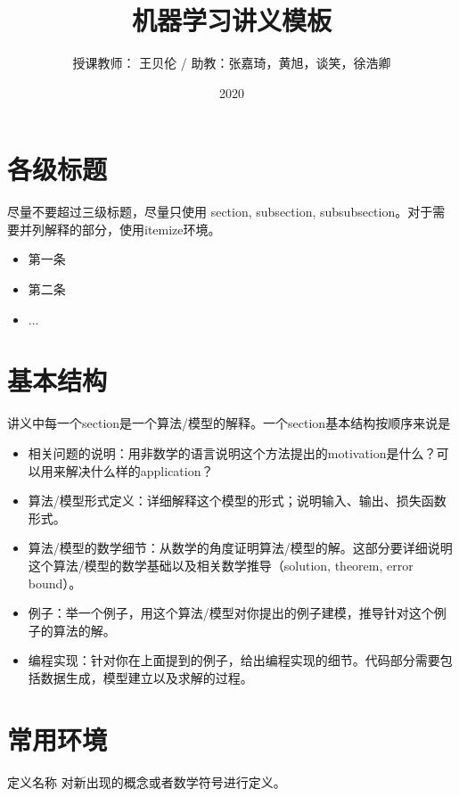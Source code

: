 \documentclass[a4paper,9pt]{extarticle}
\title{机器学习讲义模板}
\author{授课教师： 王贝伦  /  助教：张嘉琦，黄旭，谈笑，徐浩卿}
\date{2020}
\begin{document}
\maketitle

\begin{multicols*}{2}

\section{各级标题}
    尽量不要超过三级标题，尽量只使用 section, subsection, subsubsection。对于需要并列解释的部分，使用itemize环境。
    
    \begin{itemize}
        \item 第一条
        \item 第二条
        \item ...
    \end{itemize}
    
    
\section{基本结构}
    讲义中每一个section是一个算法/模型的解释。一个section基本结构按顺序来说是
    \begin{itemize}
        \item [(1)] 相关问题的说明：用非数学的语言说明这个方法提出的motivation是什么？可以用来解决什么样的application？
        \item [(2)] 算法/模型形式定义：详细解释这个模型的形式；说明输入、输出、损失函数形式。
        \item [(3)] 算法/模型的数学细节：从数学的角度证明算法/模型的解。这部分要详细说明这个算法/模型的数学基础以及相关数学推导（solution, theorem, error bound）。
        \item [(4)] 例子：举一个例子，用这个算法/模型对你提出的例子建模，推导针对这个例子的算法的解。
        \item [(5)]编程实现：针对你在上面提到的例子，给出编程实现的细节。代码部分需要包括数据生成，模型建立以及求解的过程。
    \end{itemize}

\section{常用环境}

\begin{mydef}{定义名称}
    对新出现的概念或者数学符号进行定义。
\end{mydef}


\end{multicols*}
\end{document}
